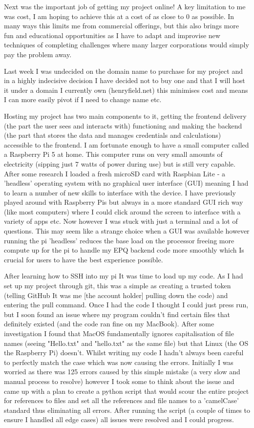 Next was the important job of getting my project online! A key limitation to me was cost, I am hoping to achieve this at a cost of as close to 0 as possible. In many ways this limits me from commercial offerings, but this also brings more fun and educational opportunities as I have to adapt and improvise new techniques of completing challenges where many larger corporations would simply pay the problem away. 

Last week I was undecided on the domain name to purchase for my project and in a highly indecisive decision I have decided not to buy one and that I will host it under a domain I currently own (henryfield.net) this minimises cost and means I can more easily pivot if I need to change name etc.

Hosting my project has two main components to it, getting the frontend delivery (the part the user sees and interacts with) functioning and making the backend (the part that stores the data and manages credentials and calculations) accessible to the frontend. I am fortunate enough to have a small computer called a Raspberry Pi 5 at home. This computer runs on very small amounts of electricity (sipping just 7 watts of power during use) but is still very capable. After some  research I loaded a fresh microSD card with Raspbian Lite - a 'headless' operating system with no graphical user interface (GUI) meaning I had to learn a number of new skills to interface with the device. I have previously played around with Raspberry Pis but always in a more standard GUI rich way (like most computers) where I could click around the screen to interface with a variety of apps etc. Now however I was stuck with just a terminal and a lot of questions. This may seem like a strange choice when a GUI was available however running the pi 'headless' reduces the base load on the processor freeing more compute up for the pi to handle my EPQ backend code more smoothly which Is crucial for users to have the best experience possible.

After learning how to SSH into my pi It was time to load up my code. As I had set up my project through git, this was a simple as creating a trusted token (telling GitHub It was me [the account holder] pulling down the code) and entering the pull command. Once I had the code I thought I could just press run, but I soon found an issue where my program couldn't find certain files that definitely existed (and the code ran fine on my MacBook). After some investigation I found that MacOS fundamentally ignores capitalisation of file names (seeing "Hello.txt" and "hello.txt" as the same file) but that Linux (the OS the Raspberry Pi) doesn't. Whilst writing my code I hadn't always been careful to perfectly match the case which was now causing the errors. Initially I was worried as there was 125 errors caused by this simple mistake (a very slow and manual process to resolve) however I took some to think about the issue and came up with a plan to create a python script that would scour the entire project for references to files and set all the references and file names to a 'camelCase' standard thus eliminating all errors. After running the script (a couple of times to ensure I handled all edge cases) all issues were resolved and I could progress.

